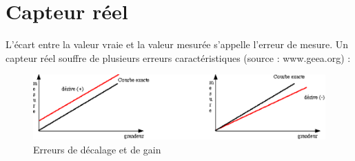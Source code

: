 \section{Capteur réel}
L'écart entre la valeur vraie et la valeur mesurée s'appelle l'erreur de mesure. Un capteur réel souffre de plusieurs erreurs caractéristiques (source : www.geea.org) :

\begin{figure}[h!]
\centering
\includegraphics[width=\textwidth]{assets/figures/4_1_8_Erreurs_de_decalage_et_de_gain.PNG}
\caption{Erreurs de décalage et de gain}
\label{fig:Erreurs_de_decalage_et_de_gain}
\end{figure}

